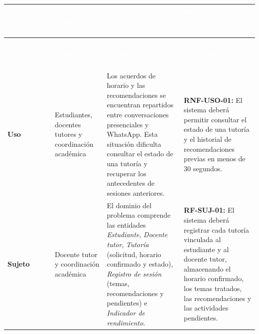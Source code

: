 \documentclass[11pt,a4paper]{article}
\begin{document}
\begin{longtable}{
    |>{\columncolor{azulclaro}\raggedright\arraybackslash}p{}
    |>{\raggedright\arraybackslash}p{}
    |>{\raggedright\arraybackslash}p{}
    |>{\raggedright\arraybackslash}p{}|
}

\hline

\rowcolor{azul}
\textcolor{white}{\textbf{Perspectiva}} &
\textcolor{white}{\textbf{Stakeholder}} &
\textcolor{white}{\textbf{Hallazgos clave}} &
\textcolor{white}{\textbf{Requisitos derivados (preliminares)}} \\

\hline
\endfirsthead

\hline

\rowcolor{azul}
\textcolor{white}{\textbf{Perspectiva}} &
\textcolor{white}{\textbf{Stakeholder}} &
\textcolor{white}{\textbf{Hallazgos clave}} &
\textcolor{white}{\textbf{Requisitos derivados (preliminares)}} \\

\hline
\endhead

\hline
\endfoot

\textbf{Uso} &
Estudiantes, docentes tutores y coordinación académica &
Los acuerdos de horario y las recomendaciones se encuentran repartidos entre conversaciones presenciales y WhatsApp. Esta situación dificulta consultar el estado de una tutoría y recuperar los antecedentes de sesiones anteriores. &
\textbf{RNF-USO-01:} El sistema deberá permitir consultar el estado de una tutoría y el historial de recomendaciones previas en menos de 30 segundos. \\

\hline

\textbf{Sujeto} &
Docente tutor y coordinación académica &
El dominio del problema comprende las entidades \emph{Estudiante}, \emph{Docente tutor}, \emph{Tutoría} (solicitud, horario confirmado y estado), \emph{Registro de sesión} (temas, recomendaciones y pendientes) e \emph{Indicador de rendimiento}. &
\textbf{RF-SUJ-01:} El sistema deberá registrar cada tutoría vinculada al estudiante y al docente tutor, almacenando el horario confirmado, los temas tratados, las recomendaciones y las actividades pendientes. \\

\hline


\end{longtable}
\end{document}
